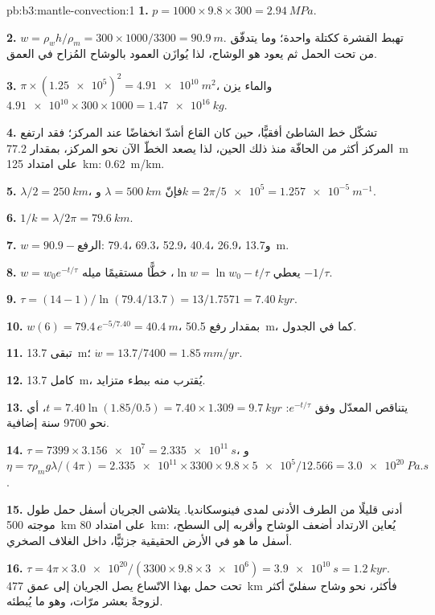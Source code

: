\begin{solution}{pb:b3:mantle-convection:1}
\textbf{1.} $p = 1000\times9.8\times300 = \qty{2.94}{MPa}$.

\textbf{2.} $w = \rho_wh/\rho_m = 300\times1000/3300 = \qty{90.9}{m}$. تهبط القشرة
ككتلة واحدة؛ وما يتدفّق من تحت الحمل ثم يعود هو
الوشاح، لذا يُوازَن العمود بالوشاح المُزاح في العمق.

\textbf{3.} $\pi\times(\num{1.25e5})^2 = \qty{4.91e10}{m^2}$، والماء
يزن $\num{4.91e10}\times300\times1000 = \qty{1.47e16}{kg}$.

\textbf{4.} تشكّل خط الشاطئ أفقيًّا، حين كان القاع أشدّ انخفاضًا عند
المركز؛ فقد ارتفع المركز أكثر من الحافّة منذ ذلك الحين، لذا يصعد الخطّ الآن
نحو المركز، بمقدار \qty{77.2}{m} على امتداد \qty{125}{km}:
\qty{0.62}{m/km}.

\textbf{5.} $\lambda/2 = \qty{250}{km}$، فإنّ $\lambda = \qty{500}{km}$ و$k =
2\pi/\num{5e5} = \qty{1.257e-5}{m^{-1}}$.

\textbf{6.} $1/k = \lambda/2\pi = \qty{79.6}{km}$.

\textbf{7.} $w = 90.9 - \text{الرفع}$: 79.4، 69.3، 52.9، 40.4، 26.9،
و\qty{13.7}{m}.

\textbf{8.} $w = w_0e^{-t/\tau}$ يعطي $\ln w = \ln w_0 - t/\tau$، خطًّا مستقيمًا
ميله $-1/\tau$.

\textbf{9.} $\tau = (14 - 1)/\ln(79.4/13.7) = 13/1.7571 = \qty{7.40}{kyr}$.

\textbf{10.} $w(6) = 79.4\,e^{-5/7.40} = \qty{40.4}{m}$، بمقدار رفع
\qty{50.5}{m}، كما في الجدول.

\textbf{11.} تبقى \qty{13.7}{m}؛ $\dot w = 13.7/7400 = \qty{1.85}{mm/yr}$.

\textbf{12.} كامل \qty{13.7}{m}، يُقترب منه ببطء متزايد.

\textbf{13.} يتناقص المعدّل وفق $e^{-t/\tau}$: $t = 7.40\ln(1.85/0.5) =
7.40\times1.309 = \qty{9.7}{kyr}$، أي نحو 9700 سنة إضافية.

\textbf{14.} $\tau = 7399\times\num{3.156e7} = \qty{2.335e11}{s}$، و$\eta =
\tau\rho_mg\lambda/(4\pi) = \num{2.335e11}\times3300\times9.8\times\num{5e5}/
12.566 = \qty{3.0e20}{Pa.s}$.

\textbf{15.} أدنى قليلًا من الطرف الأدنى لمدى فينوسكانديا. يتلاشى الجريان
أسفل حمل طول موجته \qty{500}{km} على امتداد \qty{80}{km}: يُعاين الارتداد
أضعف الوشاح وأقربه إلى السطح، أسفل ما هو في الأرض الحقيقية جزئيًّا،
داخل الغلاف الصخري.

\textbf{16.} $\tau = 4\pi\times\num{3.0e20}/(3300\times9.8\times\num{3e6}) =
\qty{3.9e10}{s} = \qty{1.2}{kyr}$. تحت حمل بهذا الاتّساع يصل الجريان
إلى عمق \qty{477}{km} فأكثر، نحو وشاح سفليّ أكثر لزوجةً بعشر مرّات،
وهو ما يُبطئه.


\end{solution}
